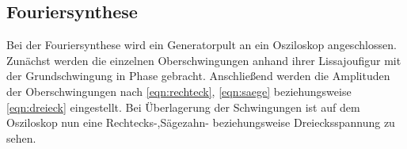 \subsection{Fouriersynthese}
Bei der Fouriersynthese wird ein Generatorpult an ein Osziloskop angeschlossen.
Zunächst werden die einzelnen Oberschwingungen anhand ihrer Lissajoufigur
mit der Grundschwingung in Phase gebracht. Anschließend werden die Amplituden
der Oberschwingungen nach \eqref{eqn:rechteck}, \eqref{eqn:saege} beziehungsweise
\eqref{eqn:dreieck} eingestellt. Bei Überlagerung der Schwingungen ist auf
dem Osziloskop nun eine Rechtecks-,Sägezahn- beziehungsweise Dreiecksspannung
zu sehen.
